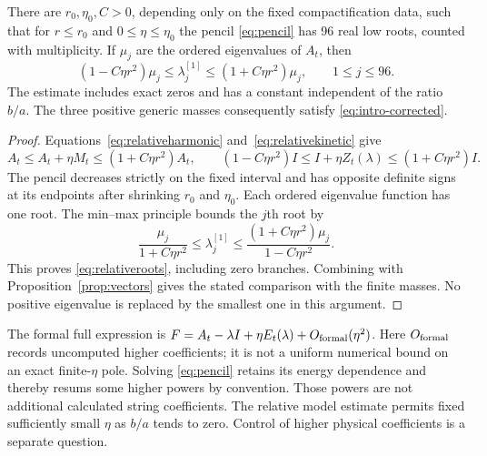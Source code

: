 \begin{proposition}\label{prop:coupled}
There are $r_0,\eta_0,C>0$, depending only on the fixed
compactification data, such that for $r\le r_0$ and
$0\le\eta\le\eta_0$ the pencil \eqref{eq:pencil} has
96 real low roots, counted with multiplicity. If $\mu_j$ are
the ordered eigenvalues of $A_t$, then
\begin{equation}\label{eq:relativeroots}
 (1-C\eta r^2)\mu_j\le\lambda_j^{[1]}
                    \le(1+C\eta r^2)\mu_j,\qquad 1\le j\le96.
\end{equation}
The estimate includes exact zeros and has a constant independent
of the ratio $b/a$. The three positive generic masses consequently
satisfy \eqref{eq:intro-corrected}.
\end{proposition}
\begin{proof}
Equations~\eqref{eq:relativeharmonic} and~\eqref{eq:relativekinetic}
give
\[
 A_t\le A_t+\eta M_t\le(1+C\eta r^2)A_t,\qquad
 (1-C\eta r^2)I\le I+\eta Z_t(\lambda)\le(1+C\eta r^2)I.
\]
The pencil decreases strictly on the fixed interval and has
opposite definite signs at its endpoints after shrinking $r_0$
and $\eta_0$. Each ordered eigenvalue function has one root.
The min--max principle bounds the $j$th root by
\[
 \frac{\mu_j}{1+C\eta r^2}
 \le\lambda_j^{[1]}\le
 \frac{(1+C\eta r^2)\mu_j}{1-C\eta r^2}.
\]
This proves \eqref{eq:relativeroots}, including zero branches.
Combining with Proposition~\ref{prop:vectors} gives the stated
comparison with the finite masses. No positive eigenvalue is
replaced by the smallest one in this argument.
\end{proof}

The formal full expression is
$F=A_t-\lambda I+\eta E_t(\lambda)+O_{\mathrm{formal}}(\eta^2)$.
Here $O_{\mathrm{formal}}$ records uncomputed higher coefficients; it is
not a uniform numerical bound on an exact finite-$\eta$ pole.
Solving \eqref{eq:pencil} retains its energy dependence and
thereby resums some higher powers by convention. Those powers
are not additional calculated string coefficients. The relative
model estimate permits fixed sufficiently small $\eta$ as
$b/a$ tends to zero. Control of higher physical coefficients
is a separate question.
